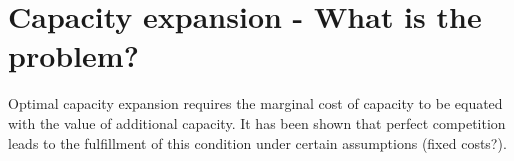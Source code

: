 \section{Capacity expansion - What is the problem?}

Optimal capacity expansion requires the marginal cost of capacity to be equated with the value of additional capacity. It has been shown that perfect competition leads to the fulfillment of this condition under certain assumptions (fixed costs?). 

\cite{Fehr1994}